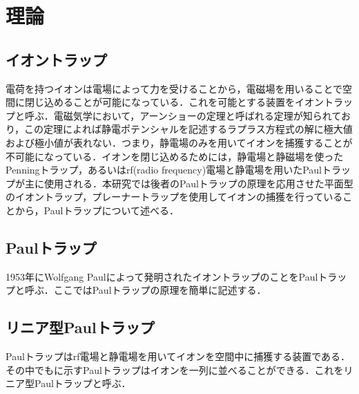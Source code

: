 \chapter{理論}\label{sec:theory}
\section{イオントラップ}
電荷を持つイオンは電場によって力を受けることから，電磁場を用いることで空間に閉じ込めることが可能になっている．これを可能とする装置をイオントラップと呼ぶ．電磁気学において，アーンショーの定理と呼ばれる定理が知られており，この定理によれば静電ポテンシャルを記述するラプラス方程式の解に極大値および極小値が表れない．つまり，静電場のみを用いてイオンを捕獲することが不可能になっている．イオンを閉じ込めるためには，静電場と静磁場を使ったPenningトラップ，あるいはrf(radio frequency)電場と静電場を用いたPaulトラップが主に使用される．本研究では後者のPaulトラップの原理を応用させた平面型のイオントラップ，プレーナートラップを使用してイオンの捕獲を行っていることから，Paulトラップについて述べる．
\section{Paulトラップ}
1953年にWolfgang Paulによって発明されたイオントラップのことをPaulトラップと呼ぶ．ここではPaulトラップの原理を簡単に記述する．
\section{リニア型Paulトラップ}
Paulトラップはrf電場と静電場を用いてイオンを空間中に捕獲する装置である．その中でもに示すPaulトラップはイオンを一列に並べることができる．これをリニア型Paulトラップと呼ぶ．

